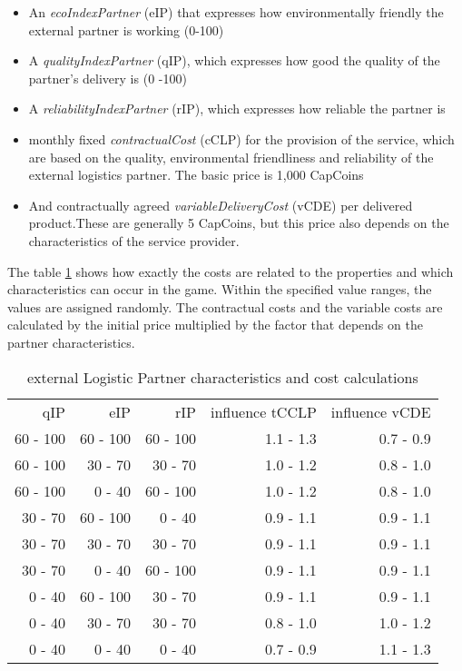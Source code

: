 \begin{itemize}
    \item An \textit{ecoIndexPartner} (\gls{eIP}) that expresses how environmentally friendly the external partner is working (0-100)
    \item A \textit{qualityIndexPartner} (\gls{qIP}), which expresses how good the quality of the partner's delivery is (0 -100)
    \item A \textit{reliabilityIndexPartner} (\gls{rIP}), which expresses how reliable the partner is
    \item monthly fixed \textit{contractualCost} (\gls{cCLP}) for the provision of the service, which are based on the quality, environmental friendliness and reliability of the external logistics partner. The basic price is 1,000 CapCoins 
    \item And contractually agreed \textit{variableDeliveryCost} (\gls{vCDE}) per delivered product.These are generally 5 CapCoins, but this price also depends on the characteristics of the service provider.
\end{itemize}

The table \ref{External_logistic_partner_characteristics} shows how exactly the costs are related to the properties and which characteristics can occur in the game. Within the specified value ranges, the values are assigned randomly. The contractual costs and the variable costs are calculated by the initial price multiplied by the factor that depends on the partner characteristics.

\begin{table}[ht]
    \centering
    \begin{tabular}{|r|r|r|r|r|}
    \hline
    qIP & eIP & rIP & influence tCCLP & influence vCDE \\
    60 - 100      & 60 - 100   & 60 - 100  & 1.1 - 1.3    & 0.7 - 0.9     \\
    60 - 100      & 30 - 70    & 30 - 70   & 1.0 - 1.2    & 0.8 - 1.0     \\
    60 - 100      & 0 - 40     & 60 - 100  & 1.0 - 1.2    & 0.8 - 1.0     \\
    30 - 70       & 60 - 100   & 0 - 40    & 0.9 - 1.1    & 0.9 - 1.1     \\
    30 - 70       & 30 - 70    & 30 - 70   & 0.9 - 1.1    & 0.9 - 1.1     \\
    30 - 70       & 0 - 40     & 60 - 100  & 0.9 - 1.1    & 0.9 - 1.1     \\
    0 - 40        & 60 - 100   & 30 - 70   & 0.9 - 1.1    & 0.9 - 1.1     \\
    0 - 40        & 30 - 70    & 30 - 70   & 0.8 - 1.0    & 1.0 - 1.2     \\
    0 - 40        & 0 - 40     & 0 - 40    & 0.7 - 0.9    & 1.1 - 1.3     \\
    \hline
    \end{tabular}
    \caption{external Logistic Partner characteristics and cost calculations}
    \label{External_logistic_partner_characteristics}
\end{table}

